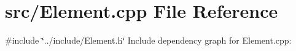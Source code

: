 \section{src/\-Element.cpp \-File \-Reference}
\label{_element_8cpp}
{\ttfamily \#include \char`\"{}../include/\-Element.\-h\char`\"{}}\*
\-Include dependency graph for \-Element.\-cpp\-:
